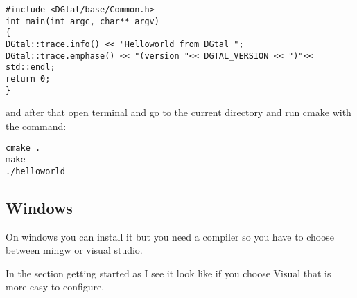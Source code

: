 \documentclass{article}
\begin{document}
\begin{verbatim}
#include <DGtal/base/Common.h>
int main(int argc, char** argv)
{
DGtal::trace.info() << "Helloworld from DGtal ";
DGtal::trace.emphase() << "(version "<< DGTAL_VERSION << ")"<< std::endl;
return 0;
}
\end{verbatim}

and after that open terminal and go to the current directory and run cmake with the command:
\begin{verbatim}
cmake .
make
./helloworld
\end{verbatim}

\subsection{Windows}

On windows you can install it but you need a compiler so you have to choose between mingw or visual studio.

In the section getting started as I see it look like if you choose Visual that is more easy to configure.
\end{document}
